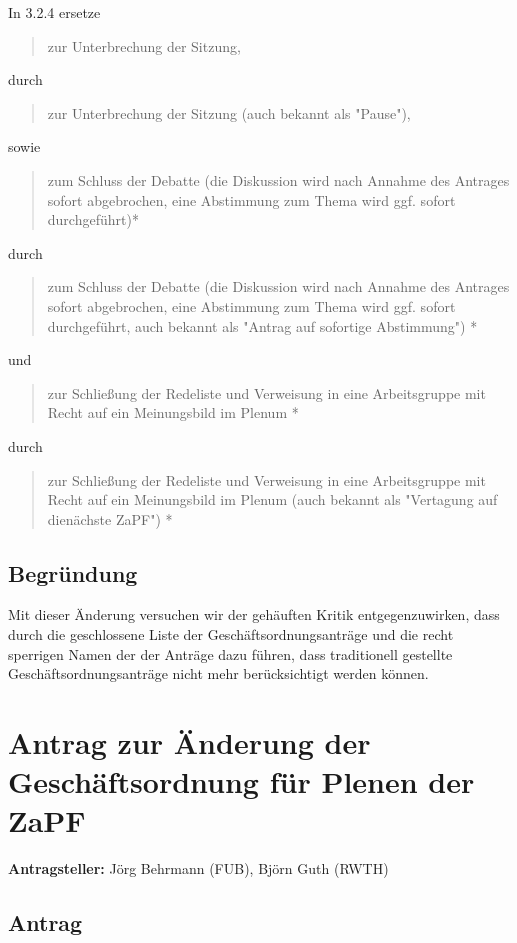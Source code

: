 \documentclass[draft,10pt,oneside]{scrartcl}
\begin{document}
In 3.2.4 ersetze
\begin{quote}
	zur Unterbrechung der Sitzung,
\end{quote}
durch
\begin{quote}
	zur Unterbrechung der Sitzung (auch bekannt als "Pause"),
\end{quote}
sowie
\begin{quote}
	zum Schluss der Debatte (die Diskussion wird nach Annahme des Antrages
	sofort abgebrochen, eine Abstimmung zum Thema wird ggf. sofort
	durchgeführt)*
\end{quote}
durch
\begin{quote}
	zum Schluss der Debatte (die Diskussion wird nach Annahme des Antrages
	sofort abgebrochen, eine Abstimmung zum Thema wird ggf. sofort
	durchgeführt, auch bekannt als "Antrag auf sofortige Abstimmung") *
\end{quote}
und
\begin{quote}
	zur Schließung der Redeliste und Verweisung in eine Arbeitsgruppe mit Recht
	auf ein Meinungsbild im Plenum *
\end{quote}
durch
\begin{quote}
	zur Schließung der Redeliste und Verweisung in eine Arbeitsgruppe mit Recht
	auf ein Meinungsbild im Plenum (auch bekannt als "Vertagung auf dienächste
	ZaPF") *
\end{quote}

\subsection*{Begründung}
Mit dieser Änderung versuchen wir der gehäuften Kritik entgegenzuwirken, dass
durch die geschlossene Liste der Geschäftsordnungsanträge und die recht
sperrigen Namen der der Anträge dazu führen, dass traditionell gestellte
Geschäftsordnungsanträge nicht mehr berücksichtigt werden können.

\newpage

\section*{Antrag zur Änderung der Geschäftsordnung für Plenen der ZaPF}

\textbf{Antragsteller:} Jörg Behrmann (FUB), Björn Guth (RWTH)

\subsection*{Antrag}
\end{document}
